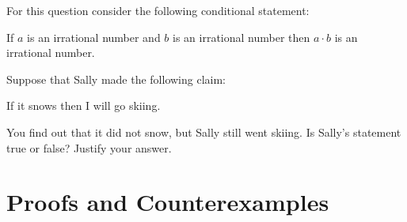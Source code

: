 \documentclass[11pt,answers]{exam}
\begin{document}
\begin{questions}

\question For this question consider the following conditional statement:
	\begin{center}
	If $a$ is an irrational number and $b$ is an irrational number then $a\cdot b$ is an irrational number.
	\end{center}

\question Suppose that Sally made the following claim:
	\begin{center}
	If it snows then I will go skiing.
	\end{center}
	
You find out that it did not snow, but Sally still went skiing. Is Sally's statement true or false? Justify your answer.
\vfill
\end{questions}

\newpage


\section{Proofs and Counterexamples}
\end{document}
